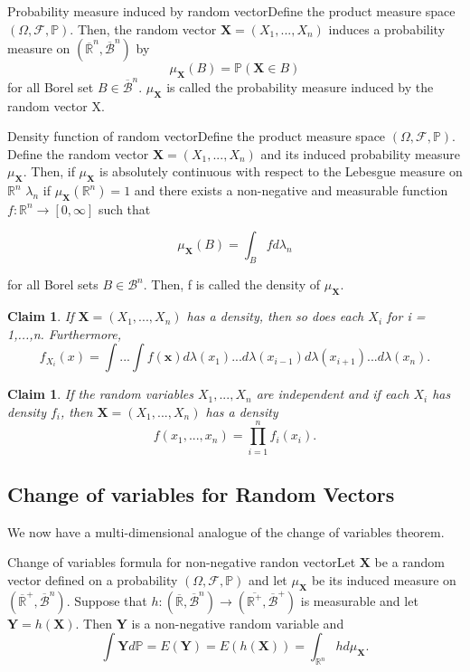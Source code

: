 \documentclass[twoside]{article}
\newtheorem{claim}[theorem]{Claim}
\newcommand{\sigmalgebra}{\mathcal{F}}
\newcommand{\borelsigmaalgebra}{\mathcal{B}}
\newcommand{\extendedreal}{\overline{\mathbb{R}}}
\newcommand{\positivereal}{\mathbb{R}^+}
\newcommand{\prob}{\mathbb{P}}
\begin{document}
\begin{definition_exam}{Probability measure induced by random vector}{}Define the product measure space $(\Omega, \sigmalgebra, \prob).$ Then, the random vector $\textbf{X} = (X_1,...,X_n)$ induces a probability measure on $(\extendedreal^n, \overline{\borelsigmaalgebra}^n)$ by 
$$
\mu_{\textbf{X}}(B) = \prob(\textbf{X} \in B)
$$
for all Borel set $B \in \overline{\borelsigmaalgebra}^n.$ $\mu_{\textbf{X}}$ is called the probability measure induced by the random vector X.
\end{definition_exam}


\begin{definition_exam}{Density function of random vector}{}Define the product measure space $(\Omega, \sigmalgebra, \prob).$ Define the random vector $\textbf{X} = (X_1,...,X_n)$ and its induced probability measure $\mu_{\textbf{X}}.$ Then, if $\mu_{\textbf{X}}$ is absolutely continuous with respect to the Lebesgue measure on $\mathbb{R}^n$ $\lambda_n$ if $\mu_{\textbf{X}}(\mathbb{R}^n) = 1$ and there exists a non-negative and measurable function $f: \mathbb{R}^n \rightarrow [0,\infty]$  such that 

$$
\mu_{\textbf{X}} (B) = \int_{B} f d \lambda_{n}
$$

for all Borel sets $B \in \borelsigmaalgebra^n$. Then, f is called the density of $\mu_{\textbf{X}}.$
\end{definition_exam}

\begin{claim}If $\textbf{X} = (X_1,...,X_n)$ has a density, then so does each $X_i$ for i = 1,...,n. Furthermore, 
$$
f_{X_{i}}(x) = \int ... \int f(\textbf{x})d\lambda (x_1)... d\lambda (x_{i-1})d\lambda (x_{i+1})...d\lambda (x_{n}).
$$
\end{claim}


\begin{claim}If the random variables $X_1,...,X_n$ are independent and if each $X_i$ has density $f_i$, then $\textbf{X} = (X_1,...,X_n)$ has a density 
$$
f(x_1,...,x_n) = \prod_{i=1}^{n}f_i(x_i).
$$
\end{claim}

\subsection{Change of variables for Random Vectors}

We now have a multi-dimensional analogue of the change of variables theorem.

\begin{theorem_exam}{Change of variables formula for non-negative randon vector}{}Let $\textbf{X}$ be a random vector defined on a probability $(\Omega, \sigmalgebra, \prob)$ and let $\mu_{\textbf{X}}$ be its induced measure on $(\extendedreal^+, \overline{\borelsigmaalgebra}^n)$. Suppose that $h: (\extendedreal, \overline{\borelsigmaalgebra}^n) \rightarrow (\overline{\positivereal}, \overline{\borelsigmaalgebra}^+)$ is measurable and let $\textbf{Y} = h(\textbf{X}).$ Then \textbf{Y} is a non-negative random variable and 
$$
\int \textbf{Y}d\prob = E(\textbf{Y}) = E(h(\textbf{X})) = \int_{\mathbb{R}^n}hd\mu_{\textbf{X}}.
$$
\end{theorem_exam}
\end{document}
